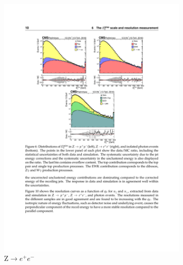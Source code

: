      \begin{figure}[!htb]
        \centering
        \begin{subfigure}[t]{0.31\textwidth}
          \includegraphics[width=\textwidth]{figures/met_resolution_zee.pdf}
          \caption{Z$\to e^+ e^-$}
          \label{fig:met_resolution_zee}
        \end{subfigure}
        \quad
        \begin{subfigure}[t]{0.31\textwidth}

\end{subfigure}
\end{figure}
